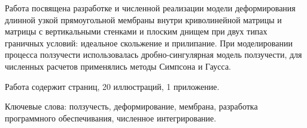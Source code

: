 Работа посвящена разработке и численной реализации модели деформирования длинной узкой 
прямоугольной мембраны внутри криволинейной матрицы и матрицы с вертикальными стенками и плоским днищем
при двух типах граничных условий: идеальное скольжение и прилипание.
При моделировании процесса ползучести использовалась дробно-сингулярная
модель ползучести, для численных расчетов применялись методы Симпсона и Гаусса.

Работа содержит \pageref{LastPage} страниц, 20 иллюстраций, 1 приложение.



Ключевые слова: ползучесть, деформирование, мембрана, разработка программного обеспечивания, численное интегрирование.
\newpage